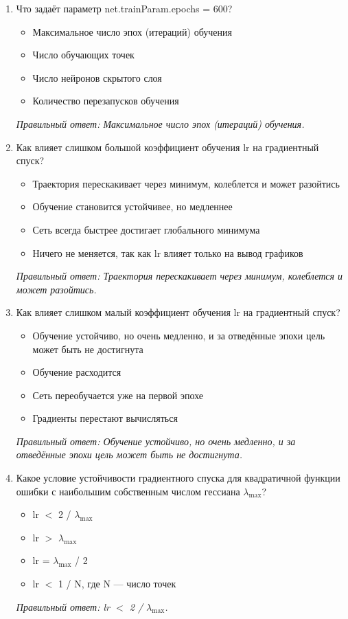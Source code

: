 \begin{enumerate}[label=\textbf{\arabic*.}, leftmargin=0pt, itemsep=1.2em]
\item Что задаёт параметр net.trainParam.epochs = 600?
\begin{itemize}[label=$\square$, leftmargin=1.5cm, itemsep=0.2em, topsep=0.3em]
\item Максимальное число эпох (итераций) обучения
\item Число обучающих точек
\item Число нейронов скрытого слоя
\item Количество перезапусков обучения
\end{itemize}
{\small\textit{Правильный ответ: Максимальное число эпох (итераций) обучения.}}

\item Как влияет слишком большой коэффициент обучения lr на градиентный спуск?
\begin{itemize}[label=$\square$, leftmargin=1.5cm, itemsep=0.2em, topsep=0.3em]
\item Траектория перескакивает через минимум, колеблется и может разойтись
\item Обучение становится устойчивее, но медленнее
\item Сеть всегда быстрее достигает глобального минимума
\item Ничего не меняется, так как lr влияет только на вывод графиков
\end{itemize}
{\small\textit{Правильный ответ: Траектория перескакивает через минимум, колеблется и может разойтись.}}

\item Как влияет слишком малый коэффициент обучения lr на градиентный спуск?
\begin{itemize}[label=$\square$, leftmargin=1.5cm, itemsep=0.2em, topsep=0.3em]
\item Обучение устойчиво, но очень медленно, и за отведённые эпохи цель может быть не достигнута
\item Обучение расходится
\item Сеть переобучается уже на первой эпохе
\item Градиенты перестают вычисляться
\end{itemize}
{\small\textit{Правильный ответ: Обучение устойчиво, но очень медленно, и за отведённые эпохи цель может быть не достигнута.}}

\item Какое условие устойчивости градиентного спуска для квадратичной функции ошибки с наибольшим собственным числом гессиана $\lambda_{\max}$?
\begin{itemize}[label=$\square$, leftmargin=1.5cm, itemsep=0.2em, topsep=0.3em]
\item lr $<$ 2 / $\lambda_{\max}$
\item lr $>$ $\lambda_{\max}$
\item lr = $\lambda_{\max}$ / 2
\item lr $<$ 1 / N, где N — число точек
\end{itemize}
{\small\textit{Правильный ответ: lr $<$ 2 / $\lambda_{\max}$.}}


\end{enumerate}
